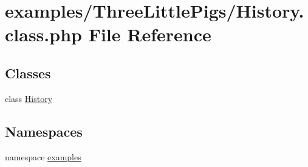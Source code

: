\hypertarget{_history_8class_8php}{
\section{examples/ThreeLittlePigs/History.class.php File Reference}
\label{_history_8class_8php}
}
\subsection*{Classes}
\begin{CompactItemize}
\item 
class \hyperlink{class_history}{History}
\end{CompactItemize}
\subsection*{Namespaces}
\begin{CompactItemize}
\item 
namespace \hyperlink{namespaceexamples}{examples}
\end{CompactItemize}
